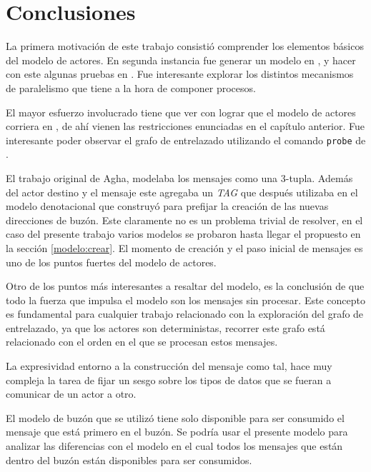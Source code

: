 \chapter{Conclusiones}

La primera motivación de este trabajo consistió comprender los elementos básicos del modelo de actores. En segunda instancia fue generar un modelo en \CSP, y hacer con este algunas pruebas en \FDR. Fue interesante explorar los distintos mecanismos de paralelismo que tiene \CSP a la hora de componer procesos.

El mayor esfuerzo involucrado tiene que ver con lograr que el modelo de actores corriera en \FDR, de ahí vienen las restricciones enunciadas en el capítulo anterior. Fue interesante poder observar el grafo de entrelazado utilizando el comando \verb=probe= de \FDR. 

El trabajo original de Agha\cite{Agha:1986:AMC:7929}, modelaba los mensajes como una 3-tupla. Además del actor destino y el mensaje este agregaba un \textit{TAG} que después utilizaba en el modelo denotacional que construyó para prefijar la creación de las nuevas direcciones de buzón. Este claramente no es un problema trivial de resolver, en el caso del presente trabajo varios modelos se probaron hasta llegar el propuesto en la sección \ref{modelo:crear}. El momento de creación y el paso inicial de mensajes es uno de los puntos fuertes del modelo de actores.

Otro de los puntos más interesantes a resaltar del modelo, es la conclusión de que todo la fuerza que impulsa el modelo son los mensajes sin procesar. Este concepto es fundamental para cualquier trabajo relacionado con la exploración del grafo de entrelazado, ya que los actores son deterministas, recorrer este grafo está relacionado con el orden en el que se procesan estos mensajes.

La expresividad entorno a la construcción del mensaje como tal, hace muy compleja la tarea de fijar un sesgo sobre los tipos de datos que se fueran a comunicar de un actor a otro.

El modelo de buzón que se utilizó tiene solo disponible para ser consumido el mensaje que está primero en el buzón. Se podría usar el presente modelo para analizar las diferencias con el modelo en el cual todos los mensajes que están dentro del buzón están disponibles para ser consumidos.
